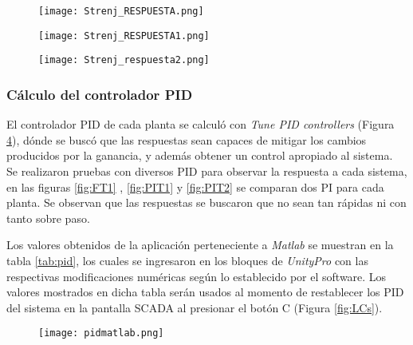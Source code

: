 {\begin{comment}
 dónde el motor no era esforzado a calentarse ni la bomba era sobreexigida

escalones ubicados en la parte central del rango útil estipulado .

 además obtener un control apropiado al sistema: algo no muy rapido ni muy lento
\end{comment}


\begin{figure}[htb]
	\centering
	\texttt{[image: Strenj\_RESPUESTA.png]}
	\label{fig:FT01}
\end{figure}
\begin{figure}[htb]
	\centering
	\texttt{[image: Strenj\_RESPUESTA1.png]}
	\label{fig:PIT01}
\end{figure}




\begin{figure}[htb]
	\centering
	\texttt{[image: Strenj\_respuesta2.png]}
	\label{fig:PIT02}
\end{figure}






\subsubsection{Cálculo del controlador PID}
El controlador PID de cada planta se calculó con \textit{Tune PID controllers} (Figura \ref{fig:PIDcontr}), dónde se buscó que las respuestas sean capaces de mitigar los cambios producidos por la ganancia, y además obtener un control apropiado al sistema. \\
Se realizaron pruebas con diversos PID para observar la respuesta a cada sistema, en las figuras \ref{fig:FT1} , \ref{fig:PIT1} y \ref{fig:PIT2} se comparan dos PI para cada planta. Se observan que las respuestas se buscaron que no sean tan rápidas ni con tanto sobre paso.

Los valores obtenidos de la aplicación perteneciente a \textit{Matlab} se muestran en la tabla \ref{tab:pid}, los cuales se ingresaron en los bloques de \textit{UnityPro} con las respectivas modificaciones numéricas según lo establecido por el software. Los valores mostrados en dicha tabla serán usados al momento de restablecer los PID del sistema en la pantalla SCADA al presionar el botón C (Figura \ref{fig:LCs}).
\begin{figure}[h!]
	\centering
	\texttt{[image: pidmatlab.png]}
	\label{fig:PIDcontr}
\end{figure}

}
